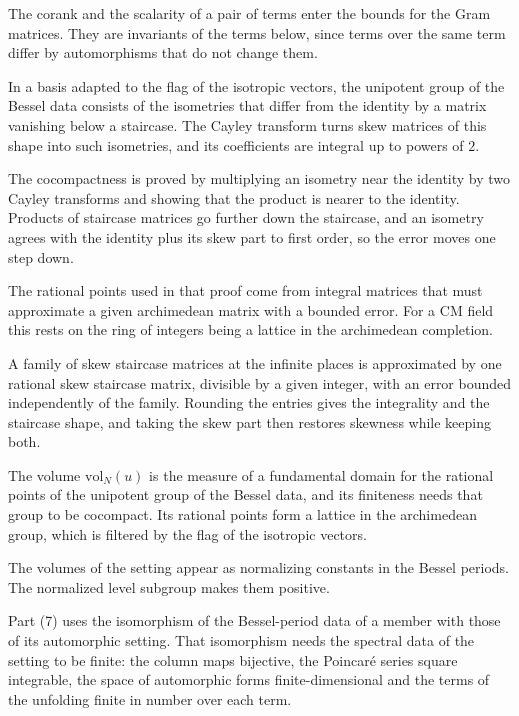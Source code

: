 The corank and the scalarity of a pair of terms enter the bounds for the Gram
matrices. They are invariants of the terms below, since terms over the same
term differ by automorphisms that do not change them.

In a basis adapted to the flag of the isotropic vectors, the unipotent group of the Bessel data
consists of the isometries that differ from the identity by a matrix vanishing below a staircase. The
Cayley transform turns skew matrices of this shape into such isometries, and its coefficients are
integral up to powers of $2$.

The cocompactness is proved by multiplying an isometry near the identity by two Cayley transforms and
showing that the product is nearer to the identity. Products of staircase matrices go further down
the staircase, and an isometry agrees with the identity plus its skew part to first order, so the
error moves one step down.

The rational points used in that proof come from integral matrices that must approximate a given
archimedean matrix with a bounded error. For a CM field this rests on the ring of integers being a
lattice in the archimedean completion.

A family of skew staircase matrices at the infinite places is approximated by one rational skew
staircase matrix, divisible by a given integer, with an error bounded independently of the family.
Rounding the entries gives the integrality and the staircase shape, and taking the skew part then
restores skewness while keeping both.

The volume $\mathrm{vol}_N(u)$ is the measure of a fundamental domain for the rational points of the
unipotent group of the Bessel data, and its finiteness needs that group to be cocompact. Its rational
points form a lattice in the archimedean group, which is filtered by the flag of the isotropic vectors.

The volumes of the setting appear as normalizing constants in the Bessel
periods. The normalized level subgroup makes them positive.

Part (7) uses the isomorphism of the Bessel-period data of a member with
those of its automorphic setting. That isomorphism needs the spectral data of
the setting to be finite: the column maps bijective, the Poincaré series
square integrable, the space of automorphic forms finite-dimensional and the
terms of the unfolding finite in number over each term.

